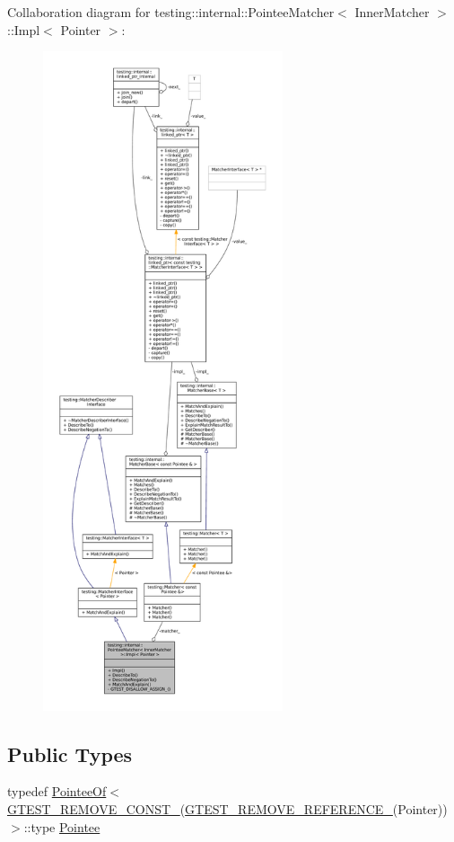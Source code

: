 Collaboration diagram for testing\+:\+:internal\+:\+:Pointee\+Matcher$<$ Inner\+Matcher $>$\+:\+:Impl$<$ Pointer $>$\+:
\nopagebreak
\begin{figure}[H]
\begin{center}
\leavevmode
\includegraphics[height=550pt]{classtesting_1_1internal_1_1PointeeMatcher_1_1Impl__coll__graph}
\end{center}
\end{figure}
\subsection*{Public Types}
\begin{DoxyCompactItemize}
\item 
typedef \hyperlink{structtesting_1_1internal_1_1PointeeOf}{Pointee\+Of}$<$ \hyperlink{gtest-internal_8h_a2ffec8c60510eb130af387f5ce9a756a}{G\+T\+E\+S\+T\+\_\+\+R\+E\+M\+O\+V\+E\+\_\+\+C\+O\+N\+S\+T\+\_\+}(\hyperlink{gtest-internal_8h_a84c72f25a6a6600e3ff8381ca6982ae9}{G\+T\+E\+S\+T\+\_\+\+R\+E\+M\+O\+V\+E\+\_\+\+R\+E\+F\+E\+R\+E\+N\+C\+E\+\_\+}(Pointer))$>$\+::type \hyperlink{classtesting_1_1internal_1_1PointeeMatcher_1_1Impl_af28def7caaa864201e03f6fcd54a841b}{Pointee}
\end{DoxyCompactItemize}
